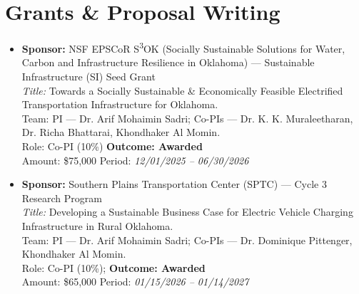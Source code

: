 \documentclass[a4paper,11pt]{article}
\begin{document}
\section{Grants \& Proposal Writing}
\begin{itemize}[leftmargin=*,labelsep=1mm,itemsep=0.8mm]

\item \textbf{Sponsor:} NSF EPSCoR S\textsuperscript{3}OK (Socially Sustainable Solutions for Water, Carbon and Infrastructure Resilience in Oklahoma) — Sustainable Infrastructure (SI) Seed Grant \\
\textit{Title:} Towards a Socially Sustainable \& Economically Feasible Electrified Transportation Infrastructure for Oklahoma. \\
Team: PI — Dr. Arif Mohaimin Sadri; Co-PIs — Dr. K. K. Muraleetharan, Dr. Richa Bhattarai, Khondhaker Al Momin.\\
Role: Co-PI (10\%) \hfill \textbf{Outcome: Awarded} \\
Amount: \$75,000 \hfill Period: \textit{12/01/2025 – 06/30/2026}


\item \textbf{Sponsor:} Southern Plains Transportation Center (SPTC) — Cycle 3 Research Program \\
\textit{Title:} Developing a Sustainable Business Case for Electric Vehicle Charging Infrastructure in Rural Oklahoma. \\
Team: PI — Dr. Arif Mohaimin Sadri; Co-PIs — Dr. Dominique Pittenger, Khondhaker Al Momin.\\
Role: Co-PI (10\%);  \hfill \textbf{Outcome: Awarded} \\
Amount: \$65,000 \hfill Period: \textit{01/15/2026 – 01/14/2027}





\end{itemize}
\end{document}
